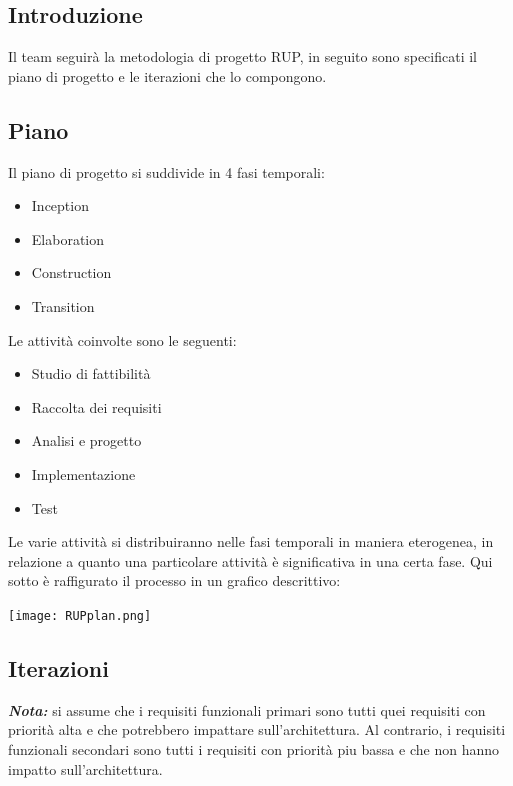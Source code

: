 \setlength{\arrayrulewidth}{.5mm}
\setlength{\tabcolsep}{5pt}
\renewcommand{\arraystretch}{2}

\subsection{Introduzione}
Il team seguirà la metodologia di progetto RUP, in seguito sono specificati il piano di progetto e le
iterazioni che lo compongono.

\subsection{Piano}
Il piano di progetto si suddivide in 4 fasi temporali:
\begin{itemize}
    \item Inception
    \item Elaboration
    \item Construction
    \item Transition
\end{itemize}
Le attività coinvolte sono le seguenti:
\begin{itemize}
    \item Studio di fattibilità
    \item Raccolta dei requisiti
    \item Analisi e progetto
    \item Implementazione
    \item Test
\end{itemize}
Le varie attività si distribuiranno nelle fasi temporali in maniera eterogenea, in relazione a quanto una particolare attività è significativa in una certa fase. Qui sotto è raffigurato il processo in un grafico descrittivo: \vspace{0.6cm}

\texttt{[image: RUPplan.png]}

\subsection{Iterazioni}

\emph{\textbf{Nota:}} si assume che i requisiti funzionali primari sono tutti quei requisiti con priorità alta e che potrebbero impattare sull'architettura. Al contrario, i requisiti funzionali secondari sono tutti i requisiti con priorità piu bassa e che non hanno impatto sull'architettura.

